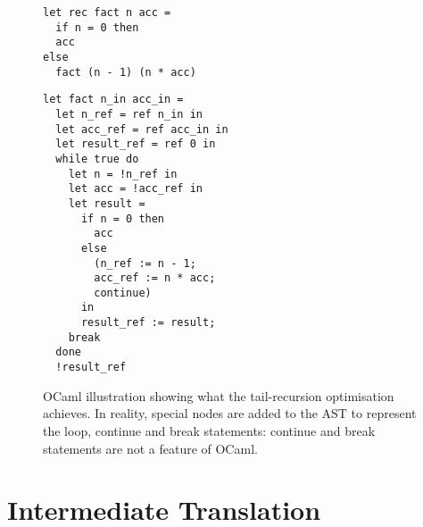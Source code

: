 \begin{figure}[h]
\begin{minipage}[t]{0.5\linewidth}
\begin{verbatim}
let rec fact n acc =
  if n = 0 then
  acc
else
  fact (n - 1) (n * acc)
\end{verbatim}
\end{minipage}
\begin{minipage}[t]{0.5\linewidth}
\begin{verbatim}
let fact n_in acc_in =
  let n_ref = ref n_in in
  let acc_ref = ref acc_in in
  let result_ref = ref 0 in
  while true do
    let n = !n_ref in
    let acc = !acc_ref in
    let result =
      if n = 0 then
        acc
      else
        (n_ref := n - 1;
        acc_ref := n * acc;
        continue)
      in
      result_ref := result;
    break
  done
  !result_ref
\end{verbatim}
\end{minipage}
\caption{OCaml illustration showing what the tail-recursion optimisation achieves. In reality, special nodes are added to the AST to represent the loop, continue and break statements: continue and break statements are not a feature of OCaml.}
\label{fig:tailrec}
\end{figure}





\section{Intermediate Translation}

